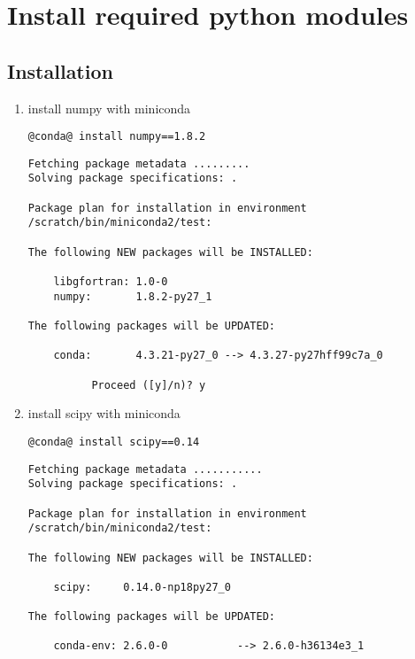 \section{Install required python modules}
\label{section:install-py-modules}

\subsection{Installation}

\begin{enumerate}
\item  install numpy with miniconda
\begin{lstlisting}[style=bashstyle]
@conda@ install numpy==1.8.2
\end{lstlisting}
\begin{lstlisting}[style=bashstyle]
Fetching package metadata .........
Solving package specifications: .

Package plan for installation in environment /scratch/bin/miniconda2/test:

The following NEW packages will be INSTALLED:

    libgfortran: 1.0-0
    numpy:       1.8.2-py27_1

The following packages will be UPDATED:

    conda:       4.3.21-py27_0 --> 4.3.27-py27hff99c7a_0

          Proceed ([y]/n)? y
\end{lstlisting}

          
\item  install scipy with miniconda
\begin{lstlisting}[style=bashstyle]
@conda@ install scipy==0.14
\end{lstlisting}
\begin{lstlisting}[style=bashstyle]
Fetching package metadata ...........
Solving package specifications: .

Package plan for installation in environment /scratch/bin/miniconda2/test:

The following NEW packages will be INSTALLED:

    scipy:     0.14.0-np18py27_0

The following packages will be UPDATED:

    conda-env: 2.6.0-0           --> 2.6.0-h36134e3_1



\end{lstlisting}
\end{enumerate}
